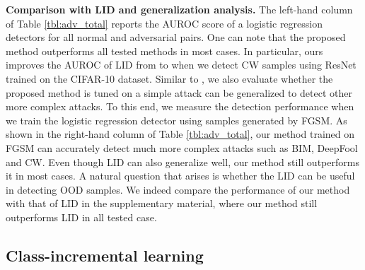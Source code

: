 \documentclass{article}
\begin{document}
{\bf Comparison with LID and generalization analysis.}
The left-hand column of Table \ref{tbl:adv_total} reports the AUROC score of a logistic regression detectors for all normal and adversarial pairs.
One can note that the proposed method outperforms all tested methods in most cases.
In particular, 
ours improves the AUROC of LID from  to  when we detect CW samples using ResNet trained on the CIFAR-10 dataset.
Similar to \citep{ma2018characterizing}, 
we also evaluate whether the proposed method is tuned on a simple attack can be generalized to detect other more complex attacks.
To this end, we measure the detection performance when we train the logistic regression detector using samples generated by FGSM.
As shown in the right-hand column of Table \ref{tbl:adv_total},
our method trained on FGSM can accurately detect much more complex attacks such as BIM, DeepFool and CW.
Even though LID can also generalize well, our method still outperforms it in most cases.
A natural question that arises is whether the LID can be useful in detecting OOD samples. We indeed compare the performance of our method with that of LID in the supplementary material, where our method still outperforms LID in all tested case.




\subsection{Class-incremental learning}
\end{document}
